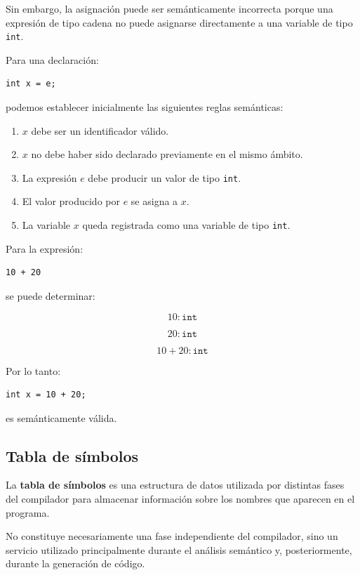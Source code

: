 \documentclass[11pt,a4paper]{article}
\begin{document}
Sin embargo, la asignación puede ser semánticamente incorrecta porque una
expresión de tipo cadena no puede asignarse directamente a una variable de
tipo \texttt{int}.

Para una declaración:

\begin{lstlisting}
int x = e;
\end{lstlisting}

podemos establecer inicialmente las siguientes reglas semánticas:

\begin{enumerate}
    \item $x$ debe ser un identificador válido.
    \item $x$ no debe haber sido declarado previamente en el mismo ámbito.
    \item La expresión $e$ debe producir un valor de tipo \texttt{int}.
    \item El valor producido por $e$ se asigna a $x$.
    \item La variable $x$ queda registrada como una variable de tipo
    \texttt{int}.
\end{enumerate}

Para la expresión:

\begin{lstlisting}
10 + 20
\end{lstlisting}

se puede determinar:

\[
10 : \texttt{int}
\]

\[
20 : \texttt{int}
\]

\[
10 + 20 : \texttt{int}
\]

Por lo tanto:

\begin{lstlisting}
int x = 10 + 20;
\end{lstlisting}

es semánticamente válida.

\subsection{Tabla de símbolos}

La \textbf{tabla de símbolos} es una estructura de datos utilizada por
distintas fases del compilador para almacenar información sobre los nombres
que aparecen en el programa.

No constituye necesariamente una fase independiente del compilador, sino un
servicio utilizado principalmente durante el análisis semántico y,
posteriormente, durante la generación de código.
\end{document}
